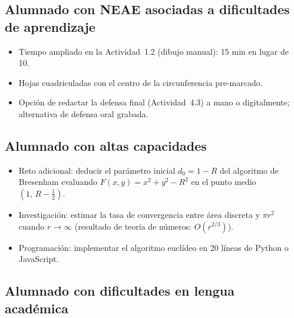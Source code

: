 \documentclass[12pt,a4paper]{scrartcl}
\begin{document}
\subsection{Alumnado con NEAE asociadas a dificultades de aprendizaje}
\begin{itemize}[leftmargin=1.3em,itemsep=0.15em,topsep=0.3em]
  \item Tiempo ampliado en la Actividad~1.2 (dibujo manual): 15 min en lugar de 10.
  \item Hojas cuadriculadas con el centro de la circunferencia pre-marcado.
  \item Opción de redactar la defensa final (Actividad~4.3) a mano o digitalmente; alternativa de defensa oral grabada.
\end{itemize}

\subsection{Alumnado con altas capacidades}
\begin{itemize}[leftmargin=1.3em,itemsep=0.15em,topsep=0.3em]
  \item Reto adicional: deducir el parámetro inicial $d_0 = 1 - R$ del algoritmo de Bresenham evaluando $F(x, y) = x^2 + y^2 - R^2$ en el punto medio $(1,\, R - \tfrac{1}{2})$.
  \item Investigación: estimar la tasa de convergencia entre área discreta y $\pi r^2$ cuando $r \to \infty$ (resultado de teoría de números: $O(r^{2/3})$).
  \item Programación: implementar el algoritmo euclídeo en 20 líneas de Python o JavaScript.
\end{itemize}

\subsection{Alumnado con dificultades en lengua académica}
\end{document}

